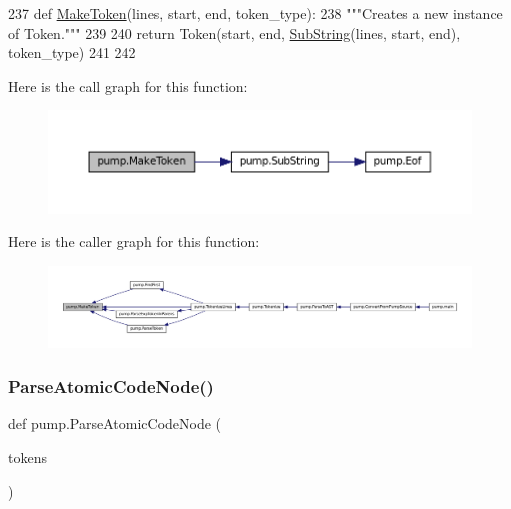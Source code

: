 \begin{DoxyCode}
237 \textcolor{keyword}{def }\hyperlink{namespacepump_af96d60dc97b160f3a18e63857aabeef7}{MakeToken}(lines, start, end, token\_type):
238   \textcolor{stringliteral}{"""Creates a new instance of Token."""}
239 
240   \textcolor{keywordflow}{return} Token(start, end, \hyperlink{namespacepump_a859edb180cfc24c24fabcfb4f2bedf9e}{SubString}(lines, start, end), token\_type)
241 
242 
\end{DoxyCode}
Here is the call graph for this function\+:
\nopagebreak
\begin{figure}[H]
\begin{center}
\leavevmode
\includegraphics[width=350pt]{namespacepump_af96d60dc97b160f3a18e63857aabeef7_cgraph}
\end{center}
\end{figure}
Here is the caller graph for this function\+:
\nopagebreak
\begin{figure}[H]
\begin{center}
\leavevmode
\includegraphics[width=350pt]{namespacepump_af96d60dc97b160f3a18e63857aabeef7_icgraph}
\end{center}
\end{figure}
\mbox{\label{namespacepump_a5532710f334f026f80fc485decf5078e}} 
\subsubsection{\texorpdfstring{Parse\+Atomic\+Code\+Node()}{ParseAtomicCodeNode()}}
{\footnotesize\ttfamily def pump.\+Parse\+Atomic\+Code\+Node (\begin{DoxyParamCaption}\item[{}]{tokens }\end{DoxyParamCaption})}



